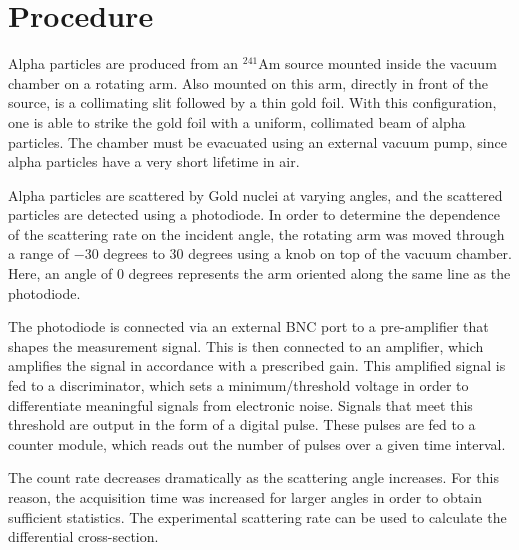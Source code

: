 \documentclass[a4paper]{article}
\begin{document}
\begin{figure}[H]
\centering
\label{name}
\end{figure}

\section{Procedure}


\qq Alpha particles are produced from an $^{241}$Am source mounted inside the
vacuum chamber on a rotating arm. Also mounted on this arm, directly in front of
the source, is a collimating slit followed by a thin gold foil. With this
configuration, one is able to strike the gold foil with a uniform, collimated
beam of alpha particles. The chamber must be evacuated using an external vacuum
pump, since alpha particles have a very short lifetime in air.

\qq Alpha particles are scattered by Gold nuclei at varying angles, and the
scattered particles are detected using a photodiode. In order to determine the
dependence of the scattering rate on the incident angle, the rotating arm was
moved through a range of $-30$ degrees to $30$ degrees using a knob on top of
the vacuum chamber. Here, an angle of 0 degrees represents the arm oriented
along the same line as the photodiode.

\qq The photodiode is connected via an external BNC port to a pre-amplifier that
shapes the measurement signal. This is then connected to an amplifier, which
amplifies the signal in accordance with a prescribed gain. This amplified signal
is fed to a discriminator, which sets a minimum/threshold voltage in order to
differentiate meaningful signals from electronic noise. Signals that meet this
threshold are output in the form of a digital pulse. These pulses are fed to a
counter module, which reads out the number of pulses over a given time interval.

The count rate decreases dramatically as the scattering angle increases. For
this reason, the acquisition time was increased for larger angles in order to
obtain sufficient statistics. The experimental scattering rate can be used to
calculate the differential cross-section.
\end{document}
